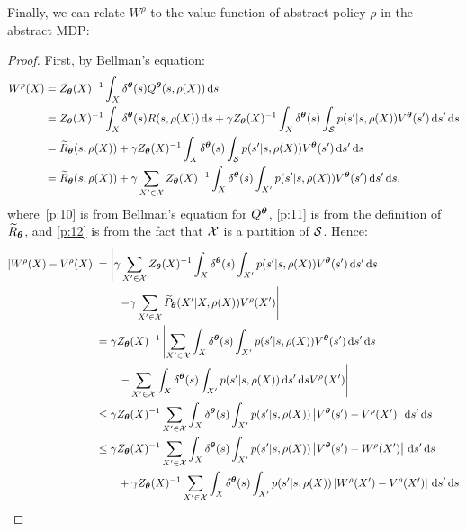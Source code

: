 Finally, we can relate $W^{\rho}$ to the value function of abstract policy $\rho$ in the abstract MDP:

\surr*
\begin{proof}
	First, by Bellman's equation:
	\begin{align}
	W^{\rho}(X) 
	&= Z_{\boldsymbol{\theta}}(X)^{-1}\int_{X}\delta^{\boldsymbol{\theta}}(s)Q^{\boldsymbol{\theta}}(s,\rho(X))\,\mathrm{d} s \nonumber\\
	&= Z_{\boldsymbol{\theta}}(X)^{-1}\int_{X}\delta^{\boldsymbol{\theta}}(s)R(s,\rho(X))\,\mathrm{d} s
	+ \gamma Z_{\boldsymbol{\theta}}(X)^{-1}\int_{X}\delta^{\boldsymbol{\theta}}(s)\int_{\mathcal{S}}p(s'|s,\rho(X))V^{\boldsymbol{\theta}}(s')\,\mathrm{d} s'\,\mathrm{d} s \label{p:10}\\
	&= \widetilde{R}_{\boldsymbol{\theta}}(s,\rho(X))
	+ \gamma Z_{\boldsymbol{\theta}}(X)^{-1}\int_{X}\delta^{\boldsymbol{\theta}}(s)\int_{\mathcal{S}}p(s'|s,\rho(X))V^{\boldsymbol{\theta}}(s')\,\mathrm{d} s'\,\mathrm{d} s \label{p:11}\\
	&= \widetilde{R}_{\boldsymbol{\theta}}(s,\rho(X))
	+ \gamma \sum_{X'\in\mathcal{X}} Z_{\boldsymbol{\theta}}(X)^{-1}\int_{X}\delta^{\boldsymbol{\theta}}(s)\int_{X'}p(s'|s,\rho(X))V^{\boldsymbol{\theta}}(s')\,\mathrm{d} s'\,\mathrm{d} s,\label{p:12}
	\end{align}
	where~\eqref{p:10} is from Bellman's equation for $Q^{\boldsymbol{\theta}}$, \eqref{p:11} is from the definition of $\widetilde{R}_{\boldsymbol{\theta}}$, and \eqref{p:12} is from the fact that $\mathcal{X}$ is a partition of $\mathcal{S}$.
	Hence:
	\begin{align}
	|W^{\rho}(X) - V^{\rho}(X)| 
	&= \left|\gamma \sum_{X'\in\Xspace} Z_{\vtheta}(X)^{-1}\int_{X}\delta^{\vtheta}(s)\int_{X'}p(s'|s,\rho(X))V^{\vtheta}(s')\de s'\de s 
	\right.\nonumber\\&\qquad\left. 
	- \gamma\sum_{X'\in\Xspace}\wt{P}_{\vtheta}(X'|X,\rho(X))V^{\rho}(X') \right| \label{p:13}\\
	&= \gamma Z_{\vtheta}(X)^{-1}\left| \sum_{X'\in\Xspace} \int_{X}\delta^{\vtheta}(s)\int_{X'}p(s'|s,\rho(X))V^{\vtheta}(s')\de s'\de s 
	\right.\nonumber\\&\qquad\left. 
	- \sum_{X'\in\Xspace}\int_{X}\delta^{\vtheta}(s)\int_{X'}p(s'|s,\rho(X))\de s'\de sV^{\rho}(X') \right| \label{p:14}\\
	&\leq \gamma Z_{\vtheta}(X)^{-1} \sum_{X'\in\Xspace} \int_{X}\delta^{\vtheta}(s)\int_{X'}p(s'|s,\rho(X))\left|V^{\vtheta}(s') - V^{\rho}(X')\right|\de s'\de s \nonumber\\
	&\leq \gamma Z_{\vtheta}(X)^{-1} \sum_{X'\in\Xspace} \int_{X}\delta^{\vtheta}(s)\int_{X'}p(s'|s,\rho(X))\left|V^{\vtheta}(s') - W^{\rho}(X')\right|\de s'\de s 
	\nonumber\\&\qquad + 
	\gamma Z_{\vtheta}(X)^{-1} \sum_{X'\in\Xspace} \int_{X}\delta^{\vtheta}(s)\int_{X'}p(s'|s,\rho(X))\left|W^{\rho}(X') - V^{\rho}(X')\right|\de s'\de s \label{p:15}\\

\end{align}
\end{proof}

